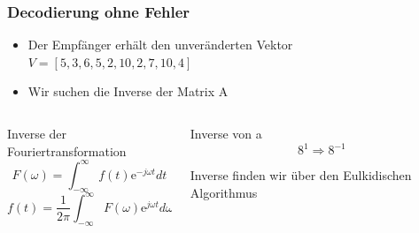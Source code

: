 \documentclass[11pt,aspectratio=169]{beamer}
\begin{document}
	\begin{frame}
		\frametitle{Decodierung ohne Fehler}
		
		\begin{itemize}
			\item Der Empfänger erhält den unveränderten Vektor $V = [5,3,6,5,2,10,2,7,10,4]$
			
			\vspace{10pt}
			
			\item Wir suchen die Inverse der Matrix A
			
		\end{itemize}
		
		\begin{columns}[t]
		\begin{column}{0.50\textwidth}		
		
		Inverse der Fouriertransformation
		\vspace{10pt}
		\[
		F(\omega) = \int_{-\infty}^{\infty} f(t) \mathrm{e}^{-j\omega t} dt
		\]
		\vspace{10pt}
		\[
		f(t) = \frac{1}{2 \pi} \int_{-\infty}^{\infty} F(\omega) \mathrm{e}^{j \omega t} d\omega
		\]
		
		\end{column}
		\begin{column}{0.50\textwidth}		
		
		Inverse von a
		\vspace{10pt}
		\[
		8^{1} \Rightarrow 8^{-1}
		\]
		
		Inverse finden wir über den Eulkidischen Algorithmus
		\vspace{10pt}
		\end{column}
		\end{columns}		
		
	\end{frame}
\end{document}
